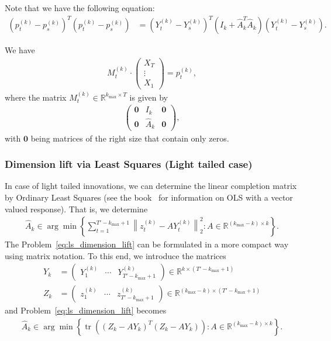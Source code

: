 Note that we have the following equation:
\begin{align}\label{eq:squared_2norm_of_lifted_points}
    \left(p_t^{(k)}-p_s^{(k)}\right)^{T}\left(p_t^{(k)}-p_s^{(k)}\right)&=\left(Y_t^{(k)}-Y_s^{(k)}\right)^{T}\left(I_k+\hat{A}_k^{T}\hat{A}_k\right)\left(Y_t^{(k)}-Y_s^{(k)}\right).
\end{align}

We have
\begin{align*}
    M_t^{(k)}\cdot\begin{pmatrix}
        X_T\\
        \vdots\\
        X_1
    \end{pmatrix}=
    p_t^{(k)},
\end{align*}
where the matrix $M_t^{(k)}\in\mathbb{R}^{k_{\max}\times T}$ is given by
\begin{align*}
    \begin{pmatrix}
        \mathbf{0} & I_k & \mathbf{0}\\
        \mathbf{0} & \hat{A}_k & \mathbf{0}
    \end{pmatrix},
\end{align*}
with $\mathbf{0}$ being matrices of the right size that contain only zeros.

\subsubsection*{Dimension lift via Least Squares (Light tailed case)}

In case of light tailed innovations, we can determine the linear completion matrix by Ordinary Least Squares (see the book~\cite{Grey_1981} for information on OLS with a vector valued response). That is, we determine
\begin{align}\label{eq:ls_dimension_lift}
    \hat{A}_k\in\arg\min\left\{\sum_{t=1}^{T'-k_{\max}+1}\left\|z_t^{(k)}-AY_{t}^{(k)}\right\|_2^2:A\in\mathbb{R}^{(k_{\max}-k)\times k}\right\}.
\end{align}
The Problem~\eqref{eq:ls_dimension_lift} can be formulated in a more compact way using matrix notation. To this end, we introduce the matrices
\begin{align*}
    Y_k&=\begin{pmatrix}
        Y_{1}^{(k)} & \cdots & Y_{T'-k_{\max}+1}^{(k)}
    \end{pmatrix}\in\mathbb{R}^{k\times(T'-k_{\max}+1)}\\
    Z_k&=\begin{pmatrix}
        z_{1}^{(k)} & \cdots & z_{T'-k_{\max}+1}^{(k)}
    \end{pmatrix}\in\mathbb{R}^{(k_{\max}-k)\times(T'-k_{\max}+1)}
\end{align*}
and Problem~\eqref{eq:ls_dimension_lift} becomes
\begin{align*}
    \hat{A}_k\in\arg\min\left\{\operatorname{tr}\left((Z_k-AY_k)^{T}(Z_k-AY_k)\right):A\in\mathbb{R}^{(k_{\max}-k)\times k}\right\}.
\end{align*}



